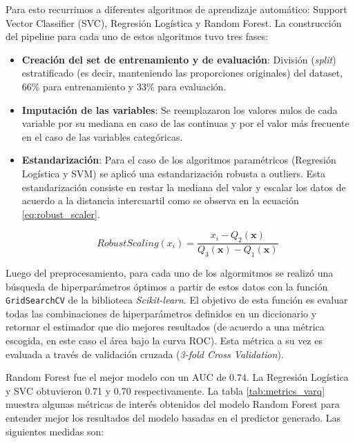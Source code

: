 Para esto recurrimos a diferentes algoritmos de aprendizaje automático: Support Vector Classifier (SVC), Regresión Logística y Random Forest. La construcción del pipeline para cada uno de estos algoritmos tuvo tres fases: 

\begin{itemize}
    \item \textbf{Creación del set de entrenamiento y de evaluación}: División (\textit{split}) estratificado (es decir, manteniendo las proporciones originales) del dataset, 66\% para entrenamiento y 33\% para evaluación. 
    \item \textbf{Imputación de las variables}: Se reemplazaron los valores nulos de cada variable por su mediana en caso de las continuas y por el valor más frecuente en el caso de las variables categóricas.
    \item \textbf{Estandarización}: Para el caso de los algoritmos paramétricos (Regresión Logística y SVM) se aplicó una estandarización robusta a outliers. Esta estandarización consiste en restar la mediana del valor y escalar los datos de acuerdo a la distancia intercuartil como se observa en la ecuación \ref{eq:robust_scaler}.
    
    \begin{equation}
        RobustScaling(x_i) = \frac{x_i - Q_2(\textbf{x})}{Q_3(\textbf{x}) - Q_1(\textbf{x})} 
        \label{eq:robust_scaler}
    \end{equation}
    
    
    
\end{itemize}

Luego del preprocesamiento, para cada uno de los algormitmos se realizó una búsqueda de hiperparámetros óptimos a partir de estos datos con la función \texttt{GridSearchCV} de la biblioteca \textit{Scikit-learn}. El objetivo de esta función es evaluar todas las combinaciones de hiperparámetros definidos en un diccionario y retornar el estimador que dio mejores resultados (de acuerdo a una métrica escogida, en este caso el área bajo la curva ROC). Esta métrica a su vez es evaluada a través de validación cruzada (\textit{3-fold Cross Validation}). 

Random Forest fue el mejor modelo con un AUC de 0.74. La Regresión Logística y SVC obtuvieron 0.71 y 0.70 respectivamente. La tabla \ref{tab:metrics_varq} muestra algunas métricas de interés obtenidos del modelo Random Forest para entender mejor los resultados del modelo basadas en el predictor generado. Las siguientes medidas son:

